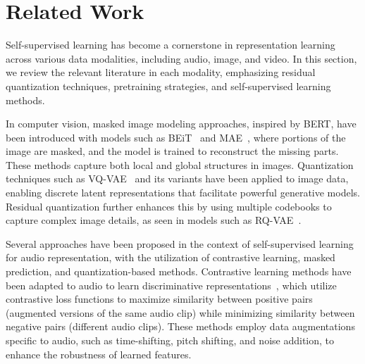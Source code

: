 \section{Related Work}

Self-supervised learning has become a cornerstone in representation learning across various data modalities, including audio, image, and video. In this section, we review the relevant literature in each modality, emphasizing residual quantization techniques, pretraining strategies, and self-supervised learning methods.

In computer vision, masked image modeling approaches, inspired by BERT, have been introduced with models such as BEiT~\cite{bao2021beit, peng2022beit, wang2023image} and MAE~\cite{he2022masked}, where portions of the image are masked, and the model is trained to reconstruct the missing parts. These methods capture both local and global structures in images.
Quantization techniques such as VQ-VAE~\cite{oord2017neural} and its variants have been applied to image data, enabling discrete latent representations that facilitate powerful generative models. Residual quantization further enhances this by using multiple codebooks to capture complex image details, as seen in models such as RQ-VAE~\cite{lee2022autoregressive}.

Several approaches have been proposed in the context of self-supervised learning for audio representation, with the utilization of contrastive learning, masked prediction, and quantization-based methods. Contrastive learning methods \cite{chen2020simple, oord2018representation} have been adapted to audio to learn discriminative representations~\cite{saeed2021contrastive}, which utilize contrastive loss functions to maximize similarity between positive pairs (augmented versions of the same audio clip) while minimizing similarity between negative pairs (different audio clips). These methods employ data augmentations specific to audio, such as time-shifting, pitch shifting, and noise addition, to enhance the robustness of learned features.


